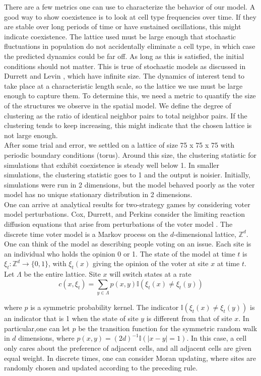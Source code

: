 \documentclass[12pt]{report}
\begin{document}
There are a few metrics one can use to characterize the behavior of our model. A good way to show coexistence is to look at cell type frequencies over time. If they are stable over long periods of time or have sustained oscillations, this might indicate coexistence. The lattice used must be large enough that stochastic fluctuations in population do not accidentally eliminate a cell type, in which case the predicted dynamics could be far off. As long as this is satisfied, the initial conditions should not matter. This is true of stochastic models as discussed in Durrett and Levin \cite{Durrett1994}, which have infinite size. The dynamics of interest tend to take place at a characteristic length scale, so the lattice we use must be large enough to capture them. To determine this, we need a metric to quantify the size of the structures we observe in the spatial model. We define the degree of clustering as the ratio of identical neighbor pairs to total neighbor pairs. If the clustering tends to keep increasing, this might indicate that the chosen lattice is  not large enough.\\

After some trial and error, we settled on a lattice of size 75 x 75 x 75 with periodic boundary conditions (torus). Around this size, the clustering statistic for simulations that exhibit coexistence is steady well below 1. In smaller simulations, the clustering statistic goes to 1 and the output is noisier. Initially, simulations were run in 2 dimensions, but the model behaved poorly  as the voter model has no unique stationary distribution in 2 dimensions.\\

One can arrive at analytical results for two-strategy games by considering voter model perturbations. Cox, Durrett, and Perkins consider the limiting reaction diffusion equations that arise from perturbations of the voter model   \cite{Cox2011}. The discrete time voter model is a Markov process on the $d$-dimensional lattice, $\mathbb{Z}^d$. One can think of the model as describing people voting on an issue. Each site is an individual who holds the opinion 0 or 1. The state of the model at time $t$ is \(\xi_t : \mathbb{Z}^d \rightarrow \{0,1\}\), with $\xi_t(x)$ giving the opinion of the voter at site $x$ at time $t$. Let $\Lambda$ be the entire lattice. Site $x$ will switch states at a rate
\[ c(x, \xi_t) = \sum_{y \in \Lambda} p(x, y) \mathbb{I}\left( \xi_t(x) \ne \xi_t (y) \right) \]

where $p$ is a symmetric probability kernel. The indicator $\mathbb{I}\left( \xi_t(x) \ne \xi_t (y) \right)$ is an indicator that is 1 when the state of site $y$ is different from that of site $x$. In particular,one can let $p$ be the transition function for the symmetric random walk in $d$ dimensions, where $p(x,y) = (2d)^{-1}\mathbb{I}(\mid x - y \mid  = 1)$. In this case, a cell only cares about the preference of adjacent cells, and all adjacent cells are given equal weight. In discrete times, one can consider Moran updating, where sites are randomly chosen and updated according to the preceding rule.\\
\end{document}
